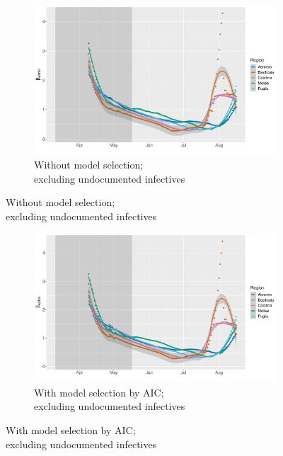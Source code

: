 \documentclass[12pt]{article}
\begin{document}
\begin{appendices}
		\begin{figure}[H]
    	    \centering
    	    \begin{subfigure}{\textwidth}
    	      \centering
    	      \includegraphics[width=0.94\linewidth]{output/model_within_lag14_betawithin_Sud_rollingwindow30.pdf}
    	      \caption{Without model selection; \\ excluding undocumented infectives}
    	      \label{fig:beta_within_over_time_sud_lowsample_regular}
    	    \end{subfigure}\newline
        \end{figure}
        \begin{figure}[H]\ContinuedFloat
    	    \begin{subfigure}{\textwidth}
    	      \centering
    	      \includegraphics[width=0.94\linewidth]{output/model_within_lag14_betawithin_Sud_aic_rollingwindow30.pdf}
    	      \caption{With model selection by AIC; \\ excluding undocumented infectives}
    	      \label{fig:beta_within_over_time_sud_lowsample_aic}

\end{subfigure}
\end{figure}
\end{appendices}
\end{document}
